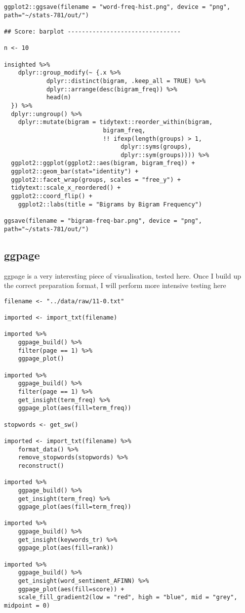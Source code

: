\documentclass[a4paper, 11pt]{article}
\begin{document}
\begin{verbatim}
ggplot2::ggsave(filename = "word-freq-hist.png", device = "png", path="~/stats-781/out/")

## Score: barplot --------------------------------

n <- 10

insighted %>%
    dplyr::group_modify(~ {.x %>%
		    dplyr::distinct(bigram, .keep_all = TRUE) %>%
		    dplyr::arrange(desc(bigram_freq)) %>%
		    head(n)
  }) %>%
  dplyr::ungroup() %>%
    dplyr::mutate(bigram = tidytext::reorder_within(bigram,
						    bigram_freq,
						    !! ifexp(length(groups) > 1,
							     dplyr::syms(groups),
							     dplyr::sym(groups)))) %>% 
  ggplot2::ggplot(ggplot2::aes(bigram, bigram_freq)) +
  ggplot2::geom_bar(stat="identity") +
  ggplot2::facet_wrap(groups, scales = "free_y") +
  tidytext::scale_x_reordered() +
  ggplot2::coord_flip() +
    ggplot2::labs(title = "Bigrams by Bigram Frequency")

ggsave(filename = "bigram-freq-bar.png", device = "png", path="~/stats-781/out/")
\end{verbatim}

\subsection{ggpage}
\label{sec:orgfdf6903}
ggpage is a very interesting piece of visualisation, tested here. Once I build up the correct preparation format, I will perform more intensive testing here
\begin{verbatim}
filename <- "../data/raw/11-0.txt"

imported <- import_txt(filename) 

imported %>%
    ggpage_build() %>%
    filter(page == 1) %>%
    ggpage_plot()

imported %>%
    ggpage_build() %>%
    filter(page == 1) %>%
    get_insight(term_freq) %>%
    ggpage_plot(aes(fill=term_freq))

stopwords <- get_sw()

imported <- import_txt(filename) %>%
    format_data() %>%
    remove_stopwords(stopwords) %>%
    reconstruct()

imported %>%
    ggpage_build() %>%
    get_insight(term_freq) %>%
    ggpage_plot(aes(fill=term_freq))

imported %>%
    ggpage_build() %>%
    get_insight(keywords_tr) %>%
    ggpage_plot(aes(fill=rank))

imported %>%
    ggpage_build() %>%
    get_insight(word_sentiment_AFINN) %>%
    ggpage_plot(aes(fill=score)) +
    scale_fill_gradient2(low = "red", high = "blue", mid = "grey", midpoint = 0)
\end{verbatim}
\end{document}

